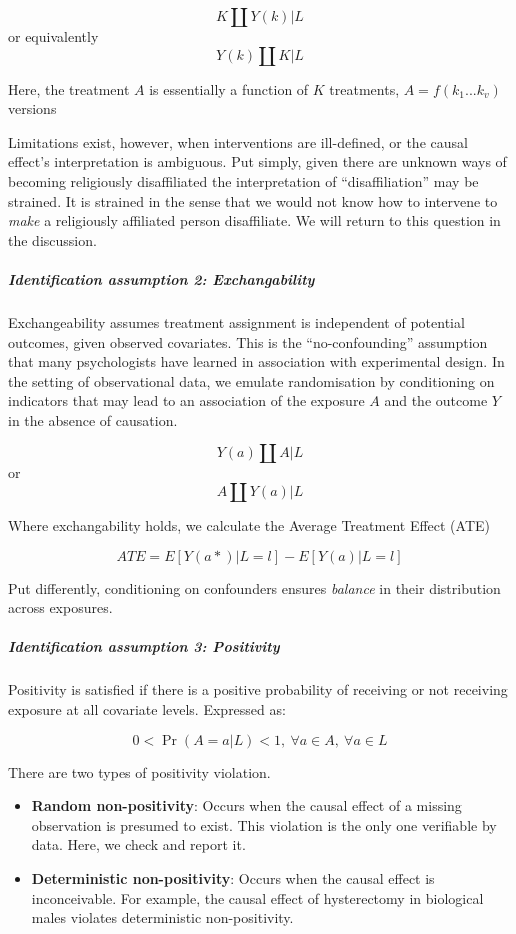 \documentclass[
  singlecolumn]{article}
\let\oldsubparagraph\subparagraph
\renewcommand{\subparagraph}[1]{\oldsubparagraph{#1}\mbox{}}
\begin{document}
\[K \coprod Y(k) | L\] or equivalently \[Y(k) \coprod K | L\]

Here, the treatment \(A\) is essentially a function of \(K\) treatments,
\(A = f(k_1...k_v)\) versions

Limitations exist, however, when interventions are ill-defined, or the
causal effect's interpretation is ambiguous. Put simply, given there are
unknown ways of becoming religiously disaffiliated the interpretation of
``disaffiliation'' may be strained. It is strained in the sense that we
would not know how to intervene to \emph{make} a religiously affiliated
person disaffiliate. We will return to this question in the discussion.

\subparagraph{Identification assumption 2:
Exchangability}\label{identification-assumption-2-exchangability}

Exchangeability assumes treatment assignment is independent of potential
outcomes, given observed covariates. This is the ``no-confounding''
assumption that many psychologists have learned in association with
experimental design. In the setting of observational data, we emulate
randomisation by conditioning on indicators that may lead to an
association of the exposure \(A\) and the outcome \(Y\) in the absence
of causation.

\[Y(a)\coprod  A|L\] or \[A \coprod  Y(a)|L\]

Where exchangability holds, we calculate the Average Treatment Effect
(ATE)

\[
ATE = E[Y(a*)|L = l] - E[Y(a)|L = l] 
\]

Put differently, conditioning on confounders ensures \emph{balance} in
their distribution across exposures.

\subparagraph{Identification assumption 3:
Positivity}\label{identification-assumption-3-positivity}

Positivity is satisfied if there is a positive probability of receiving
or not receiving exposure at all covariate levels. Expressed as:

\begin{equation}
0 < \Pr(A=a|L)<1, ~ \forall a \in A, ~ \forall a \in L
\end{equation}

There are two types of positivity violation.

\begin{itemize}
\item
  \textbf{Random non-positivity}: Occurs when the causal effect of a
  missing observation is presumed to exist. This violation is the only
  one verifiable by data. Here, we check and report it.
\item
  \textbf{Deterministic non-positivity}: Occurs when the causal effect
  is inconceivable. For example, the causal effect of hysterectomy in
  biological males violates deterministic non-positivity.
\end{itemize}
\end{document}
